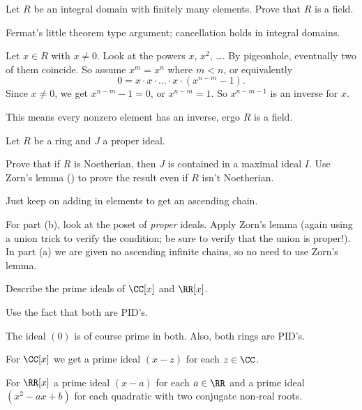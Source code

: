 \begin{sproblem}
	\gim
	Let $R$ be an integral domain with finitely many elements.
	Prove that $R$ is a field.
	\label{prob:finite_domain_field}
	\begin{hint}
		Fermat's little theorem type argument;
		cancellation holds in integral domains.
	\end{hint}
	\begin{sol}
		Let $x \in R$ with $x \neq 0$.
		Look at the powers $x$, $x^2$, \dots.
		By pigeonhole, eventually two of them coincide.
		So assume $x^m = x^n$ where $m < n$, or equivalently
		\[ 0  = x \cdot x \cdot \dots \cdot x
			\cdot \left( x^{n-m} - 1 \right). \]
		Since $x \neq 0$, we get $x^{n-m} - 1 = 0$,
		or $x^{n-m} = 1$.
		So $x^{n-m-1}$ is an inverse for $x$.

		This means every nonzero element has an inverse,
		ergo $R$ is a field.
	\end{sol}
\end{sproblem}

\begin{sproblem}
	\label{prob:krull_max_ideal}
	Let $R$ be a ring and $J$ a proper ideal.
	\begin{enumerate}[(a)]
		\ii Prove that if $R$ is Noetherian,
		then $J$ is contained in a maximal ideal $I$.
		\ii Use Zorn's lemma ()
		to prove the result even if $R$ isn't Noetherian.
	\end{enumerate}
	\begin{hint}
		Just keep on adding in elements to get an ascending chain.
	\end{hint}
	\begin{sol}
		For part (b), look at the poset of \emph{proper} ideals.
		Apply Zorn's lemma (again using a union trick to verify the condition;
		be sure to verify that the union is proper!).
		In part (a) we are given no ascending infinite chains,
		so no need to use Zorn's lemma.
	\end{sol}
\end{sproblem}

\begin{problem}
	[{$\Spec k[x]$}]
	Describe the prime ideals of $\CC[x]$ and $\RR[x]$.
	\begin{hint}
		Use the fact that both are PID's.
	\end{hint}
	\begin{sol}
		The ideal $(0)$ is of course prime in both.
		Also, both rings are PID's.

		For $\CC[x]$ we get a prime ideal $(x-z)$ for each $z \in \CC$.

		For $\RR[x]$ a prime ideal $(x-a)$ for each $a \in \RR$
		and a prime ideal $(x^2 - ax + b)$ for each quadratic
		with two conjugate non-real roots.
	\end{sol}
\end{problem}

